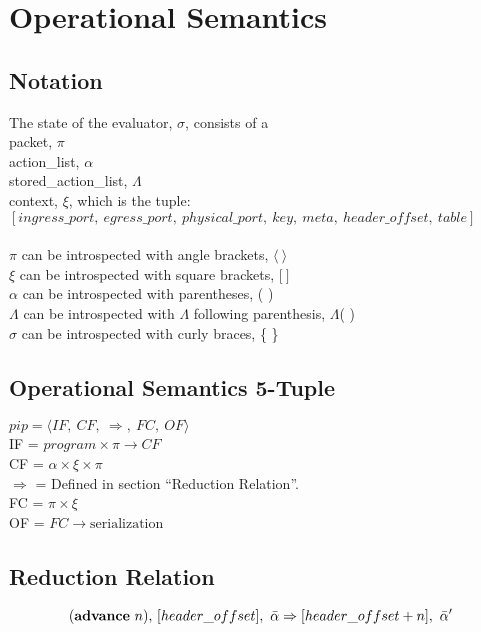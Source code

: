 \documentclass{article}
\begin{document}
\section{Operational Semantics}
\subsection{Notation}
The state of the evaluator, $\sigma$, consists of a \\
packet, $\pi$\\
action\_list, $\alpha$ \\
stored\_action\_list, $\Lambda$ \\
context, $\xi$, which is the tuple: \\
$[ ingress\_port, \ egress\_port, \ physical\_port, \ key, \ meta, \ header\_offset, \ table ]$
\\ \\
$\pi$ can be introspected with angle brackets, $\langle \ \rangle$ \\
$\xi$ can be introspected with square brackets, $\lbrack \ \rbrack$ \\
$\alpha$ can be introspected with parentheses, ( ) \\
$\Lambda$ can be introspected with $\Lambda$ following parenthesis, $\Lambda$( ) \\
$\sigma$ can be introspected with curly braces, \{ \} \\
\subsection{Operational Semantics 5-Tuple}
$ pip = \langle IF, \ CF, \ \Rightarrow, \ FC, \ OF \rangle $\\
IF = $program \times \pi \rightarrow CF$ \\
CF = $\alpha \times \xi \times \pi$ \\
$\Rightarrow$ = Defined in section ``Reduction Relation''. \\
FC = $\pi \times \xi$ \\
OF = $FC \rightarrow \textrm{serialization}$

\subsection{Reduction Relation}
\begin{equation}
  (\textbf{\textrm{advance}} \ n)\textrm{,} \ [header\_offset], \ \bar \alpha \Rightarrow [header\_offset + n], \ \bar \alpha'
\end{equation}
\end{document}
